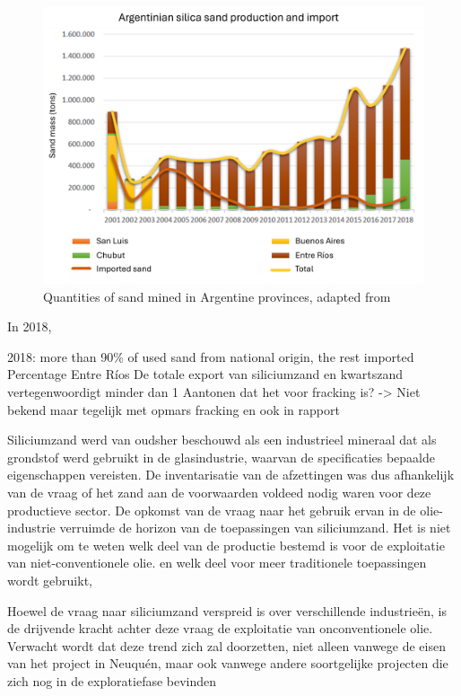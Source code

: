 \begin{figure}[H]
    \centering
    \includegraphics[width=1\linewidth]{figures/ch9/Sandgraphquantities.png}
    \caption{Quantities of sand mined in Argentine provinces, adapted from \cite{secretariadepoliticamineraArenasParaFracking2019}}
    \label{fig:sanddiagram}
\end{figure}

In 2018, 

2018: more than 90\% of used sand from national origin, the rest imported
Percentage Entre Ríos
De totale export van siliciumzand en kwartszand vertegenwoordigt minder dan 1%
Aantonen dat het voor fracking is? -> Niet bekend maar tegelijk met opmars fracking en ook in rapport

Siliciumzand werd van oudsher beschouwd als een industrieel mineraal dat als grondstof werd gebruikt in de
glasindustrie, waarvan de specificaties bepaalde eigenschappen
vereisten.
De inventarisatie van de afzettingen was dus afhankelijk van de vraag of het zand aan de voorwaarden voldeed
nodig waren voor deze productieve sector. De opkomst van de vraag naar het gebruik ervan in de olie-industrie
verruimde de horizon van de toepassingen van siliciumzand.
Het is niet mogelijk om te weten welk deel van de productie bestemd is voor de exploitatie van niet-conventionele olie.
en welk deel voor meer traditionele toepassingen wordt gebruikt,

Hoewel de vraag naar siliciumzand verspreid is over verschillende industrieën, is de drijvende kracht achter deze vraag de
exploitatie van onconventionele olie. Verwacht wordt dat deze trend zich zal doorzetten, niet alleen vanwege de eisen van
het project in Neuquén, maar ook vanwege andere soortgelijke projecten die zich nog in de exploratiefase bevinden


